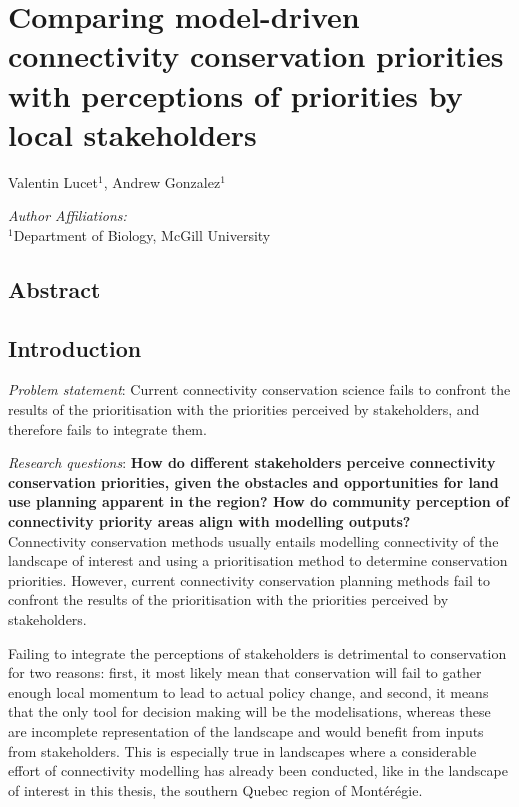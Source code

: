 \chapter{Comparing model-driven connectivity conservation priorities with perceptions of priorities by local stakeholders}
\begin{center}
{Valentin Lucet$^{1}$, Andrew Gonzalez$^{1}$}\\
\end{center}
\textit{Author Affiliations:}\\
\normalsize{$^{1}$Department of Biology, McGill University}\\

\section{Abstract}

\section{Introduction}

\textit{Problem statement}: Current connectivity conservation science  fails to confront the results of the prioritisation with the priorities perceived by stakeholders, and therefore fails to integrate them.

\textit{Research questions}: \textbf{How do different stakeholders perceive connectivity conservation priorities, given the obstacles and opportunities for land use planning apparent in the region? How do community perception of connectivity priority areas align with modelling outputs?} \\

Connectivity conservation methods usually entails modelling connectivity of the landscape of interest and using a prioritisation method to determine conservation priorities. However, current connectivity conservation planning methods fail to confront the results of the prioritisation with the priorities perceived by stakeholders.

Failing to integrate the perceptions of stakeholders is detrimental to conservation for two reasons: first, it most likely mean that conservation will fail to gather enough local momentum to lead to actual policy change, and second, it means that the only tool for decision making will be the modelisations, whereas these are incomplete representation of the landscape and would benefit from inputs from stakeholders. This is especially true in landscapes where a considerable effort of connectivity modelling has already been conducted, like in the landscape of interest in this thesis, the southern Quebec region of Montérégie.

